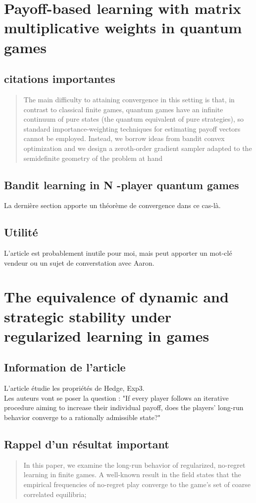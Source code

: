 \documentclass{article}
\begin{document}
\section{Payoff-based learning with matrix multiplicative weights in quantum games \cite{lotidis_payoff-based_2023}}

\subsection{citations importantes}
\begin{quote}
    The main difficulty to attaining convergence in this setting is that, in contrast to classical finite games, quantum games have an infinite continuum of pure states (the quantum equivalent of pure strategies), so standard importance-weighting techniques for estimating payoff vectors cannot be employed. Instead, we borrow ideas from bandit convex optimization and we design a zeroth-order gradient sampler adapted to the semidefinite geometry of the problem at hand
\end{quote}

\subsection{Bandit learning in N -player quantum games}
La dernière section apporte un théorème de convergence dans ce cas-là. 

\subsection{Utilité}
L'article est probablement inutile pour moi, mais peut apporter un mot-clé vendeur ou un sujet de converstation avec Aaron. 

\section{The equivalence of dynamic and strategic stability under regularized learning in games \cite{boone_equivalence_2023}}
\subsection{Information de l'article}
L'article étudie les propriétés de Hedge, Exp3.
\\
Les auteurs vont se poser la question : "If every player follows an iterative procedure aiming to increase their individual payoff, does the players’ long-run behavior converge to a rationally admissible state?"
\subsection{Rappel d'un résultat important}
\begin{quote}
    In this paper, we examine the long-run behavior of regularized, no-regret learning in finite games. A well-known result in the field states that the empirical frequencies of no-regret play converge to the game’s set of coarse correlated equilibria;
\end{quote}
\end{document}
